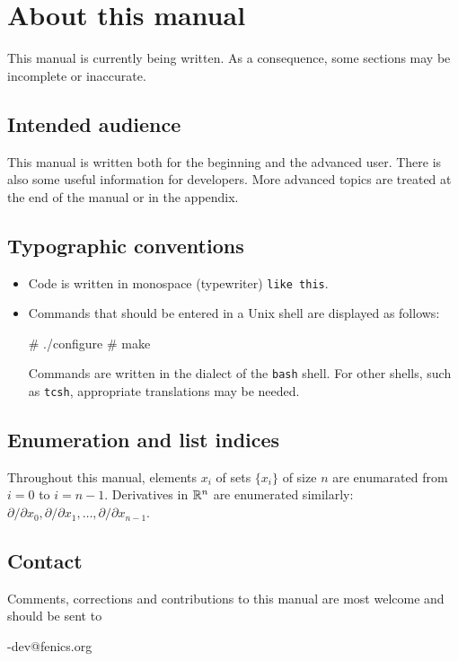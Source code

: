 
\chapter*{About this manual}

This manual is currently being written. As a consequence, some sections
may be incomplete or inaccurate.

\section*{Intended audience}

This manual is written both for the beginning and the advanced user.
There is also some useful information for developers. More advanced topics
are treated at the end of the manual or in the appendix.

\section*{Typographic conventions}

\begin{itemize}
\item
  Code is written in monospace (typewriter) \texttt{like this}.
\item
  Commands that should be entered in a Unix shell
  are displayed as follows:
  \begin{code}
# ./configure
# make
  \end{code}
  Commands are written in the dialect of the \texttt{bash} shell. For
  other shells, such as \texttt{tcsh}, appropriate translations may be
  needed.
\end{itemize}

\section*{Enumeration and list indices}

Throughout this manual, elements $x_i$ of sets $\{x_i\}$ of size $n$
are enumarated from $i = 0$ to $i = n-1$. Derivatives in $\mathbb{R}^n$ are
enumerated similarly: $\partial / \partial x_0, \partial / \partial
x_1, \ldots, \partial / \partial x_{n-1}$.

\section*{Contact}

Comments, corrections and contributions to this manual are most welcome
and should be sent to
\begin{macrocode}
\packagett{}-dev@fenics.org
\end{macrocode}
